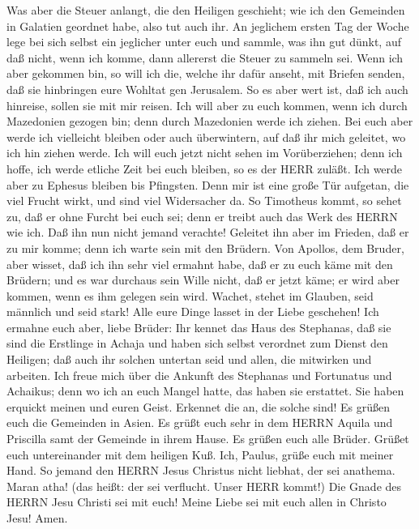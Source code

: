  Was aber die Steuer anlangt, die den Heiligen geschieht;
wie ich den Gemeinden in Galatien geordnet habe, also tut auch ihr.
 An jeglichem ersten Tag der Woche lege bei sich selbst ein
jeglicher unter euch und sammle, was ihn gut dünkt, auf daß nicht, wenn
ich komme, dann allererst die Steuer zu sammeln sei.  Wenn
ich aber gekommen bin, so will ich die, welche ihr dafür anseht, mit
Briefen senden, daß sie hinbringen eure Wohltat gen Jerusalem.
 So es aber wert ist, daß ich auch hinreise, sollen sie mit
mir reisen.  Ich will aber zu euch kommen, wenn ich durch
Mazedonien gezogen bin; denn durch Mazedonien werde ich ziehen.
 Bei euch aber werde ich vielleicht bleiben oder auch
überwintern, auf daß ihr mich geleitet, wo ich hin ziehen werde.
 Ich will euch jetzt nicht sehen im Vorüberziehen; denn ich
hoffe, ich werde etliche Zeit bei euch bleiben, so es der HERR zuläßt.
 Ich werde aber zu Ephesus bleiben bis Pfingsten.
 Denn mir ist eine große Tür aufgetan, die viel Frucht
wirkt, und sind viel Widersacher da.  So Timotheus kommt,
so sehet zu, daß er ohne Furcht bei euch sei; denn er treibt auch das
Werk des HERRN wie ich.  Daß ihn nun nicht jemand verachte!
Geleitet ihn aber im Frieden, daß er zu mir komme; denn ich warte sein
mit den Brüdern.  Von Apollos, dem Bruder, aber wisset, daß
ich ihn sehr viel ermahnt habe, daß er zu euch käme mit den Brüdern; und
es war durchaus sein Wille nicht, daß er jetzt käme; er wird aber
kommen, wenn es ihm gelegen sein wird.  Wachet, stehet im
Glauben, seid männlich und seid stark!  Alle eure Dinge
lasset in der Liebe geschehen!  Ich ermahne euch aber,
liebe Brüder: Ihr kennet das Haus des Stephanas, daß sie sind die
Erstlinge in Achaja und haben sich selbst verordnet zum Dienst den
Heiligen;  daß auch ihr solchen untertan seid und allen,
die mitwirken und arbeiten.  Ich freue mich über die
Ankunft des Stephanas und Fortunatus und Achaikus; denn wo ich an euch
Mangel hatte, das haben sie erstattet.  Sie haben erquickt
meinen und euren Geist. Erkennet die an, die solche sind! 
Es grüßen euch die Gemeinden in Asien. Es grüßt euch sehr in dem HERRN
Aquila und Priscilla samt der Gemeinde in ihrem Hause.  Es
grüßen euch alle Brüder. Grüßet euch untereinander mit dem heiligen Kuß.
 Ich, Paulus, grüße euch mit meiner Hand.  So
jemand den HERRN Jesus Christus nicht liebhat, der sei anathema. Maran
atha! (das heißt: der sei verflucht. Unser HERR kommt!) 
Die Gnade des HERRN Jesu Christi sei mit euch!  Meine Liebe
sei mit euch allen in Christo Jesu! Amen.
